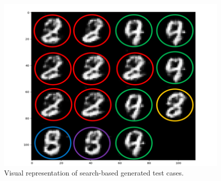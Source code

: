 \begin{itemize}
	\begin{figure}[h]
		\includegraphics[width=\linewidth]{Fig/search_visual.png}
		\caption{Visual representation of search-based generated test cases.}
		\label{fig:search_visual}
	\end{figure}
\end{itemize}
